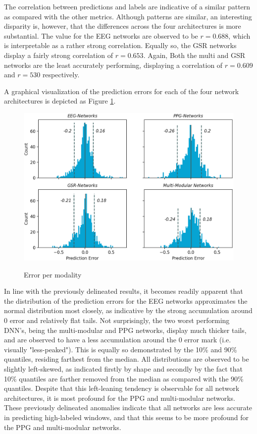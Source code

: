 \documentclass[12pt]{article}
\begin{document}
The correlation between predictions and labels are indicative of a similar pattern as compared with the other metrics. Although patterns are similar, an interesting disparity is, however, that the differences across the four architectures is more substantial. The value for the EEG networks are observed to be $r=0.688$, which is interpretable as a rather strong correlation. Equally so, the GSR networks display a fairly strong correlation of $r=0.653$. Again, Both the multi and GSR networks are the least accurately performing, displaying a correlation of $r=0.609$ and $r=530$ respectively. 

A graphical visualization of the prediction errors for each of the four network architectures is depicted as Figure \ref{fig:mae_hist}. 

\vspace{0.3cm}
\begin{figure}[h]
\caption{Error per modality}
\bigskip
\includegraphics[scale=0.6]{error_hist.png}
\label{fig:mae_hist}
\end{figure}

In line with the previously delineated results, it becomes readily apparent that the distribution of the prediction errors for the EEG networks approximates the normal distribution most closely, as indicative by the strong accumulation around 0 error and relatively flat tails. Not surprisingly, the two worst performing DNN's, being the multi-modular and PPG networks, display much thicker tails, and are observed to have a less accumulation around the 0 error mark (i.e. visually "less-peaked"). This is equally so demonstrated by the 10\% and 90\% quantiles, residing farthest from the median.  All distributions are observed to be slightly left-skewed, as indicated firstly by shape and secondly by the fact that 10\% quantiles are farther removed from the median as compared with the 90\% quantiles. Despite that this left-leaning tendency is observable for all network architectures, it is most profound for the PPG and multi-modular networks.  These previously delineated anomalies indicate that all networks are less accurate in predicting high-labeled windows, and that this seems to be more profound for the PPG and multi-modular networks.
\end{document}
